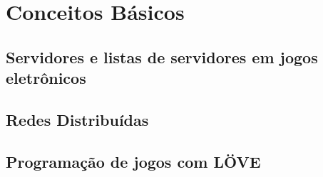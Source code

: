 \chapter{Conceitos Básicos}
\label{sec:conceitos}

\section{Servidores e listas de servidores em jogos eletrônicos}
\label{sec:conceitos:servidores}

\section{Redes Distribuídas}
\label{sec:conceitos:redes}

\section{Programação de jogos com LÖVE}
\label{sec:conceitos:love}
